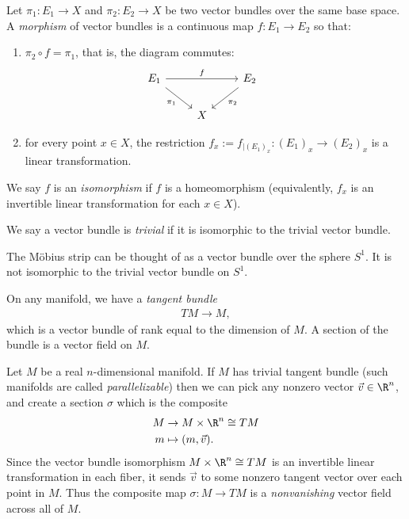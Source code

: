 \documentclass[11pt]{amsart}
\begin{document}
\begin{definition}\label{def:isomorphism-of-vb} Let $\pi_1 \colon E_1 \to X$ and $\pi_2 \colon E_2 \to X$ be two vector bundles over the same base space. A \emph{morphism} of vector bundles is a continuous map $f \colon E_1\to E_2$ so that:
\begin{enumerate}
    \item $\pi_2\circ f = \pi_1$, that is, the diagram commutes:
\[ \begin{tikzcd}
    E_1\ar[rr,"f" above]\ar[dr,"\pi_1" below left] & & E_2\ar[dl,"\pi_2" below right] & \\
     & X
\end{tikzcd}\]
    \item for every point $x\in X$, the restriction $f_x := f_{|(E_1)_x} \colon (E_1)_x \to (E_2)_x$ is a linear transformation.
\end{enumerate}
We say $f$ is an \emph{isomorphism} if $f$ is a homeomorphism (equivalently, $f_x$ is an invertible linear transformation for each $x\in X$).
\end{definition}

\begin{terminology} We say a vector bundle is \emph{trivial} if it is isomorphic to the trivial vector bundle.
\end{terminology}

\begin{example} The M\"{o}bius strip can be thought of as a vector bundle over the sphere $S^1$. It is not isomorphic to the trivial vector bundle on $S^1$.
\end{example}

\begin{example} On any manifold, we have a \emph{tangent bundle}
\begin{align*}
    TM \to M,
\end{align*}
which is a vector bundle of rank equal to the dimension of $M$. A section of the bundle is a vector field on $M$.
\end{example}

\begin{example} Let $M$ be a real $n$-dimensional manifold. If $M$ has trivial tangent bundle (such manifolds are called \emph{parallelizable}) then we can pick any nonzero vector $\vec{v}\in \R^n$, and create a section $\sigma$ which is the composite
\begin{align*}
    M &\to M \times \R^n \cong TM \\
    m &\mapsto (m,\vec{v}).
\end{align*}
Since the vector bundle isomorphism $M \times \R^n \cong TM$ is an invertible linear transformation in each fiber, it sends $\vec{v}$ to some nonzero tangent vector over each point in $M$. Thus the composite map $\sigma \colon M \to TM$ is a \emph{nonvanishing} vector field across all of $M$.
\end{example}
\end{document}
